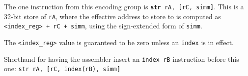 \documentclass{article}
\begin{document}
	The one instruction from this encoding group is
	\texttt{\textbf{str} rA, [rC, simm]}.
	This is a 32-bit store of \texttt{rA}, where the effective address to
	store to is computed as \texttt{<index\_reg> + rC + simm}, using the
	sign-extended form of \texttt{simm}.

	The \texttt{<index\_reg>} value is guaranteed to be zero unless an
	\texttt{index} is in effect.

	Shorthand for having the assembler insert an \texttt{index rB}
	instruction before this one: \texttt{str rA, [rC, index(rB), simm]}




\end{document}

